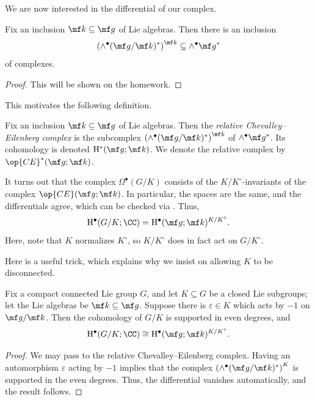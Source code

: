 \documentclass[../notes.tex]{subfiles}
\begin{document}
We are now interested in the differential of our complex.
\begin{proposition}
	Fix an inclusion $\mf k\subseteq\mf g$ of Lie algebras. Then there is an inclusion
	\[\left(\land^\bullet(\mf g/\mf k)^*\right)^{\mf k}\subseteq\land^\bullet\mf g^*\]
	of complexes.
\end{proposition}
\begin{proof}
	This will be shown on the homework.
\end{proof}
This motivates the following definition.
\begin{definition}
	Fix an inclusion $\mf k\subseteq\mf g$ of Lie algebras. Then the \textit{relative Chevalley--Eilenberg complex} is the subcomplex $\left(\land^\bullet(\mf g/\mf k)^*\right)^{\mf k}$ of $\land^\bullet\mf g^*$. Its cohomology is denoted $\mathrm H^*(\mf g;\mf k)$. We denote the relative complex by $\op{CE}^*(\mf g;\mf k)$.
\end{definition}
\begin{remark}
	It turns out that the complex $\Omega^\bullet(G/K)$ consists of the $K/K^\circ$-invariants of the complex $\op{CE}(\mf g;\mf k)$. In particular, the spaces are the same, and the differentials agree, which can be checked via . Thus,
	\[\mathrm H^\bullet(G/K;\CC)=\mathrm H^\bullet(\mf g;\mf k)^{K/K^\circ}.\]
	Here, note that $K$ normalizes $K^\circ$, so $K/K^\circ$ does in fact act on $G/K^\circ$.
\end{remark}
Here is a useful trick, which explains why we insist on allowing $K$ to be disconnected.
\begin{lemma} \label{lem:k-has-minus-one}
	Fix a compact connected Lie group $G$, and let $K\subseteq G$ be a closed Lie subgroups; let the Lie algebras be $\mf k\subseteq\mf g$. Suppose there is $\varepsilon\in K$ which acts by $-1$ on $\mf g/\mf k$. Then the cohomology of $G/K$ is supported in even degrees, and
	\[\mathrm H^\bullet(G/K;\CC)\cong\mathrm H^\bullet(\mf g;\mf k)^{K/K^\circ}.\]
\end{lemma}
\begin{proof}
	We may pass to the relative Chevalley--Eilenberg complex. Having an automorphism $\varepsilon$ acting by $-1$ implies that the complex $\left(\land^\bullet(\mf g/\mf k)^*\right)^K$ is supported in the even degrees. Thus, the differential vanishes automatically, and the result follows.
\end{proof}
\end{document}
